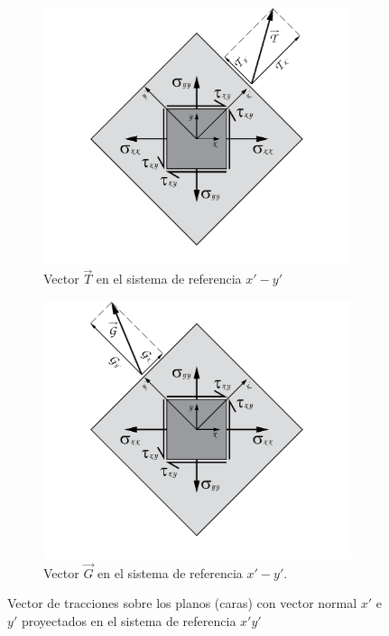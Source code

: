 \documentclass[12pt,letterpaper, twoside, openany]{article}
\begin{document}
\begin{figure}[H]
	\centering
	\begin{subfigure}[l]{0.45\textwidth}
		\includegraphics[width=9.0cm]{img/Proyecta_CaraXpProXpYp.pdf}
		\caption{\small{Vector $\overset{\rightarrow}{T}$ en el sistema de referencia $x'-y'$}}
		\label{fig:TPxpyp}
	\end{subfigure}
	\hspace{0.5 cm}
	\begin{subfigure}[r]{0.45\textwidth}
		\includegraphics[width=9.0cm]{img/Proyecta_CaraYpProXpYp.pdf}
		\caption{\small{Vector $\overset{\rightarrow}{G}$ en el sistema de referencia $x'-y'$.}}
		\label{fig:GPxpyp}
	\end{subfigure}
	\hspace{.5 cm}
	\caption{Vector de tracciones sobre los planos (caras) con vector normal $x'$ e $y'$ proyectados en el sistema de referencia $x'y'$}
	\label{fig:proycaraxpyp}
\end{figure}
\end{document}
